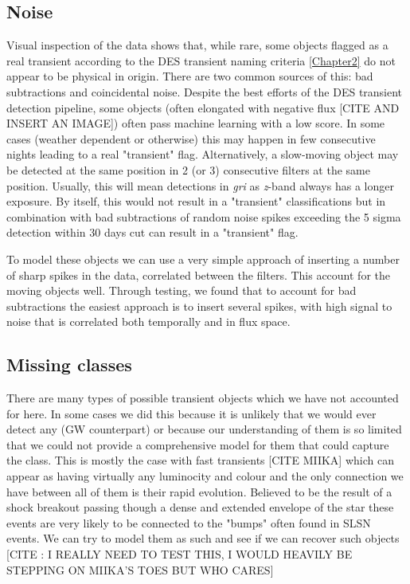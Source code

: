 \subsection{Noise}
Visual inspection of the data shows that, while rare, some objects flagged as a real transient according to the DES transient naming criteria \cref{Chapter2} do not appear to be physical in origin. There are two common sources of this: bad subtractions and coincidental noise. Despite the best efforts of the DES transient detection pipeline, some objects (often elongated with negative flux [CITE AND INSERT AN IMAGE]) often pass machine learning with a low score. In some cases (weather dependent or otherwise) this may happen in few consecutive nights leading to a real "transient" flag. Alternatively, a slow-moving object may be detected at the same position in 2 (or 3) consecutive filters at the same position. Usually, this will mean detections in \textit{gri} as \textit{z}-band always has a longer exposure. By itself, this would not result in a "transient" classifications but in combination with bad subtractions of random noise spikes exceeding the 5 sigma detection within 30 days cut can result in a "transient" flag.

To model these objects we can use a very simple approach of inserting a number of sharp spikes in the data, correlated between the filters. This account for the moving objects well. Through testing, we found that to account for bad subtractions the easiest approach is to insert several spikes, with high signal to noise that is correlated both temporally and in flux space.

\subsection{Missing classes}
There are many types of possible transient objects which we have not accounted for here. In some cases we did this because it is unlikely that we would ever detect any (GW counterpart) or because our understanding of them is so limited that we could not provide a comprehensive model for them that could capture the class. This is mostly the case with fast transients [CITE MIIKA] which can appear as having virtually any luminocity and colour and the only connection we have between all of them is their rapid evolution. Believed to be the result of a shock breakout passing though a dense and extended envelope of the star these events are very likely to be connected to the "bumps" often found in SLSN events. We can try to model them as such and see if we can recover such objects [CITE : I REALLY NEED TO TEST THIS, I WOULD HEAVILY BE STEPPING ON MIIKA'S TOES BUT WHO CARES]


